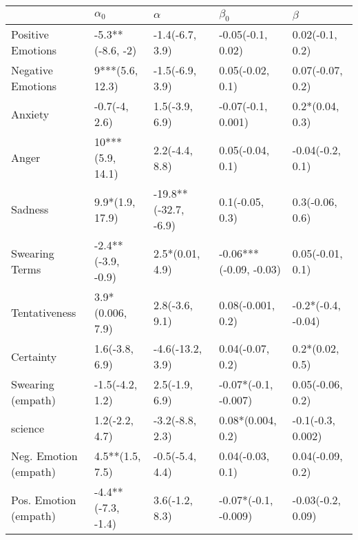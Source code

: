 \begin{tabular}{lllll}
\toprule
{} &          $\alpha_0$ &              $\alpha$ &               $\beta_0$ &             $\beta$ \\
\midrule
Positive Emotions     &    -5.3**(-8.6, -2) &       -1.4(-6.7, 3.9) &       -0.05(-0.1, 0.02) &     0.02(-0.1, 0.2) \\
Negative Emotions     &     9***(5.6, 12.3) &       -1.5(-6.9, 3.9) &        0.05(-0.02, 0.1) &    0.07(-0.07, 0.2) \\
Anxiety               &       -0.7(-4, 2.6) &        1.5(-3.9, 6.9) &      -0.07(-0.1, 0.001) &     0.2*(0.04, 0.3) \\
Anger                 &    10***(5.9, 14.1) &        2.2(-4.4, 8.8) &        0.05(-0.04, 0.1) &    -0.04(-0.2, 0.1) \\
Sadness               &     9.9*(1.9, 17.9) &  -19.8**(-32.7, -6.9) &         0.1(-0.05, 0.3) &     0.3(-0.06, 0.6) \\
Swearing Terms        &  -2.4**(-3.9, -0.9) &       2.5*(0.01, 4.9) &  -0.06***(-0.09, -0.03) &    0.05(-0.01, 0.1) \\
Tentativeness         &    3.9*(0.006, 7.9) &        2.8(-3.6, 9.1) &       0.08(-0.001, 0.2) &  -0.2*(-0.4, -0.04) \\
Certainty             &      1.6(-3.8, 6.9) &      -4.6(-13.2, 3.9) &        0.04(-0.07, 0.2) &     0.2*(0.02, 0.5) \\
Swearing (empath)     &     -1.5(-4.2, 1.2) &        2.5(-1.9, 6.9) &    -0.07*(-0.1, -0.007) &    0.05(-0.06, 0.2) \\
science               &      1.2(-2.2, 4.7) &       -3.2(-8.8, 2.3) &       0.08*(0.004, 0.2) &   -0.1(-0.3, 0.002) \\
Neg. Emotion (empath) &     4.5**(1.5, 7.5) &       -0.5(-5.4, 4.4) &        0.04(-0.03, 0.1) &    0.04(-0.09, 0.2) \\
Pos. Emotion (empath) &  -4.4**(-7.3, -1.4) &        3.6(-1.2, 8.3) &    -0.07*(-0.1, -0.009) &   -0.03(-0.2, 0.09) \\
\bottomrule
\end{tabular}
